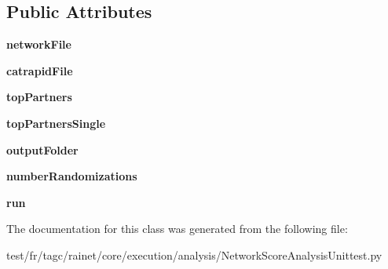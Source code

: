 \subsection*{Public Attributes}
\begin{DoxyCompactItemize}
\item 
\hypertarget{classanalysis_1_1NetworkScoreAnalysisUnittest_1_1NetworkScoreAnalysisUnittest_a8111ea541c81dcae8bb42ea72c919295}{{\bfseries network\-File}}\label{classanalysis_1_1NetworkScoreAnalysisUnittest_1_1NetworkScoreAnalysisUnittest_a8111ea541c81dcae8bb42ea72c919295}

\item 
\hypertarget{classanalysis_1_1NetworkScoreAnalysisUnittest_1_1NetworkScoreAnalysisUnittest_ab2e6c213b613cc016afec08c17fbea0d}{{\bfseries catrapid\-File}}\label{classanalysis_1_1NetworkScoreAnalysisUnittest_1_1NetworkScoreAnalysisUnittest_ab2e6c213b613cc016afec08c17fbea0d}

\item 
\hypertarget{classanalysis_1_1NetworkScoreAnalysisUnittest_1_1NetworkScoreAnalysisUnittest_ab8d569d584a81fc0c4d48d9e46ec7b44}{{\bfseries top\-Partners}}\label{classanalysis_1_1NetworkScoreAnalysisUnittest_1_1NetworkScoreAnalysisUnittest_ab8d569d584a81fc0c4d48d9e46ec7b44}

\item 
\hypertarget{classanalysis_1_1NetworkScoreAnalysisUnittest_1_1NetworkScoreAnalysisUnittest_a4bb6bd8d96cb484b455205e6e0f76505}{{\bfseries top\-Partners\-Single}}\label{classanalysis_1_1NetworkScoreAnalysisUnittest_1_1NetworkScoreAnalysisUnittest_a4bb6bd8d96cb484b455205e6e0f76505}

\item 
\hypertarget{classanalysis_1_1NetworkScoreAnalysisUnittest_1_1NetworkScoreAnalysisUnittest_ad476bce89cad474995ec14a5f5aadfb6}{{\bfseries output\-Folder}}\label{classanalysis_1_1NetworkScoreAnalysisUnittest_1_1NetworkScoreAnalysisUnittest_ad476bce89cad474995ec14a5f5aadfb6}

\item 
\hypertarget{classanalysis_1_1NetworkScoreAnalysisUnittest_1_1NetworkScoreAnalysisUnittest_a36086c4c86183a73880d9757653775af}{{\bfseries number\-Randomizations}}\label{classanalysis_1_1NetworkScoreAnalysisUnittest_1_1NetworkScoreAnalysisUnittest_a36086c4c86183a73880d9757653775af}

\item 
\hypertarget{classanalysis_1_1NetworkScoreAnalysisUnittest_1_1NetworkScoreAnalysisUnittest_acba47618f5fb8b38a4f7e499d8b0fffa}{{\bfseries run}}\label{classanalysis_1_1NetworkScoreAnalysisUnittest_1_1NetworkScoreAnalysisUnittest_acba47618f5fb8b38a4f7e499d8b0fffa}

\end{DoxyCompactItemize}


The documentation for this class was generated from the following file\-:\begin{DoxyCompactItemize}
\item 
test/fr/tagc/rainet/core/execution/analysis/Network\-Score\-Analysis\-Unittest.\-py\end{DoxyCompactItemize}
